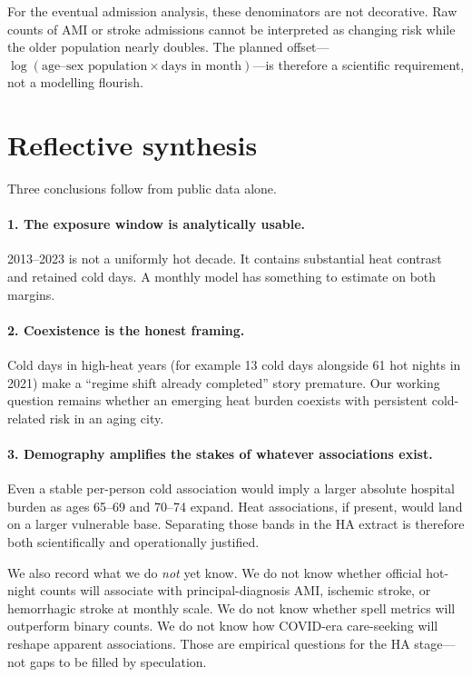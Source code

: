 \documentclass[11pt]{article}
\begin{document}
For the eventual admission analysis, these denominators are not decorative. Raw counts of
AMI or stroke admissions cannot be interpreted as changing risk while the older population
nearly doubles. The planned offset---$\log(\text{age--sex population}\times\text{days in
month})$---is therefore a scientific requirement, not a modelling flourish.

\section{Reflective synthesis}

Three conclusions follow from public data alone.

\paragraph{1. The exposure window is analytically usable.}
2013--2023 is not a uniformly hot decade. It contains substantial heat contrast and
retained cold days. A monthly model has something to estimate on both margins.

\paragraph{2. Coexistence is the honest framing.}
Cold days in high-heat years (for example 13 cold days alongside 61 hot nights in 2021)
make a ``regime shift already completed'' story premature. Our working question remains
whether an emerging heat burden coexists with persistent cold-related risk in an aging
city.

\paragraph{3. Demography amplifies the stakes of whatever associations exist.}
Even a stable per-person cold association would imply a larger absolute hospital burden as
ages 65--69 and 70--74 expand. Heat associations, if present, would land on a larger
vulnerable base. Separating those bands in the HA extract is therefore both scientifically
and operationally justified.

We also record what we do \emph{not} yet know. We do not know whether official hot-night
counts will associate with principal-diagnosis AMI, ischemic stroke, or hemorrhagic stroke
at monthly scale. We do not know whether spell metrics will outperform binary counts. We do
not know how COVID-era care-seeking will reshape apparent associations. Those are empirical
questions for the HA stage---not gaps to be filled by speculation.
\end{document}
